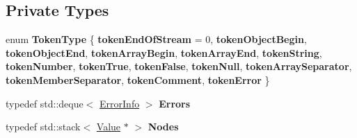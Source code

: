\subsection*{Private Types}
\begin{DoxyCompactItemize}
\item 
\mbox{\label{classJson_1_1Reader_aa35e6ab574dc399a0a645ad98ed66bc9}} 
enum {\bfseries Token\+Type} \{ \newline
{\bfseries token\+End\+Of\+Stream} = 0, 
{\bfseries token\+Object\+Begin}, 
{\bfseries token\+Object\+End}, 
{\bfseries token\+Array\+Begin}, 
\newline
{\bfseries token\+Array\+End}, 
{\bfseries token\+String}, 
{\bfseries token\+Number}, 
{\bfseries token\+True}, 
\newline
{\bfseries token\+False}, 
{\bfseries token\+Null}, 
{\bfseries token\+Array\+Separator}, 
{\bfseries token\+Member\+Separator}, 
\newline
{\bfseries token\+Comment}, 
{\bfseries token\+Error}
 \}
\item 
\mbox{\label{classJson_1_1Reader_aae51e8f5bab3f067261c842a3ef858e5}} 
typedef std\+::deque$<$ \hyperlink{classJson_1_1Reader_1_1ErrorInfo}{Error\+Info} $>$ {\bfseries Errors}
\item 
\mbox{\label{classJson_1_1Reader_a8da2114fe8b8124d41ea2f3434f0171b}} 
typedef std\+::stack$<$ \hyperlink{classJson_1_1Value}{Value} $\ast$ $>$ {\bfseries Nodes}
\end{DoxyCompactItemize}
